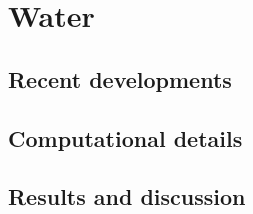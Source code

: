 \chapter{Water}
\section{Recent developments}
\section{Computational details}
\section{Results and discussion}
